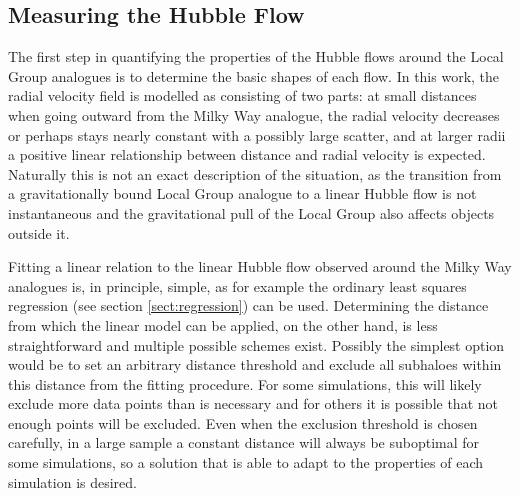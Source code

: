\documentclass[english, twoside]{HYgradu}
\begin{document}
\subsection{Measuring the Hubble Flow} \label{sect:hubblemeasurement}
The first step in quantifying the properties of the Hubble flows around the Local Group analogues is to determine the basic shapes of each flow. In this work, the radial velocity field is modelled as consisting of two parts: at small distances when going outward from the Milky Way analogue, the radial velocity decreases or perhaps stays nearly constant with a possibly large scatter, and at larger radii a positive linear relationship between distance and radial velocity is expected. Naturally this is not an exact description of the situation, as the transition from a gravitationally bound Local Group analogue to a linear Hubble flow is not instantaneous and the gravitational pull of the Local Group also affects objects outside it.

Fitting a linear relation to the linear Hubble flow observed around the Milky Way analogues is, in principle, simple, as for example the ordinary least squares regression (see section \ref{sect:regression}) can be used. Determining the distance from which the linear model can be applied, on the other hand, is less straightforward and multiple possible schemes exist. Possibly the simplest option would be to set an arbitrary distance threshold and exclude all subhaloes within this distance from the fitting procedure. For some simulations, this will likely exclude more data points than is necessary and for others it is possible that not enough points will be excluded. Even when the exclusion threshold is chosen carefully, in a large sample a constant distance will always be suboptimal for some simulations, so a solution that is able to adapt to the properties of each simulation is desired.
\end{document}
